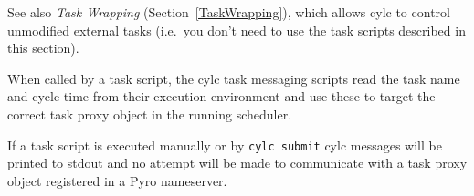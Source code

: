 
See also {\em Task Wrapping} (Section~\ref{TaskWrapping}), which allows
cylc to control unmodified external tasks (i.e.\ you don't need to 
use the task scripts described in this section).

\lstset{language=bash}

When called by a task script, the cylc task messaging scripts read the task
name and cycle time from their execution environment and use these to
target the correct task proxy object in the running scheduler.

If a task script is executed manually or by \lstinline=cylc submit=
cylc messages will be printed to stdout and no attempt will be made to
communicate with a task proxy object registered in a Pyro nameserver.
